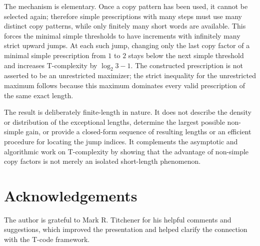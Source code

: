 \documentclass[11pt]{article}
\begin{document}
The mechanism is elementary. Once a copy pattern has been used, it cannot be
selected again; therefore simple prescriptions with many steps must use many
distinct copy patterns, while only finitely many short words are available. This
forces the minimal simple thresholds to have increments with infinitely many
strict upward jumps. At each such jump, changing only the last copy factor of a
minimal simple prescription from $1$ to $2$ stays below the next simple threshold
and increases T-complexity by $\log_2 3-1$. The constructed prescription is not
asserted to be an unrestricted maximizer; the strict inequality for the
unrestricted maximum follows because this maximum dominates every valid
prescription of the same exact length.

The result is deliberately finite-length in nature. It does not describe the density
or distribution of the exceptional lengths, determine the largest possible
non-simple gain, or provide a closed-form sequence of resulting lengths or an
efficient procedure for locating the jump indices. It complements the asymptotic
and algorithmic work on T-complexity by showing that the advantage of non-simple
copy factors is not merely an isolated short-length phenomenon.

\section*{Acknowledgements}

The author is grateful to Mark R. Titchener for his helpful comments and suggestions, which improved the presentation and helped clarify the connection with the T-code framework.
\end{document}
